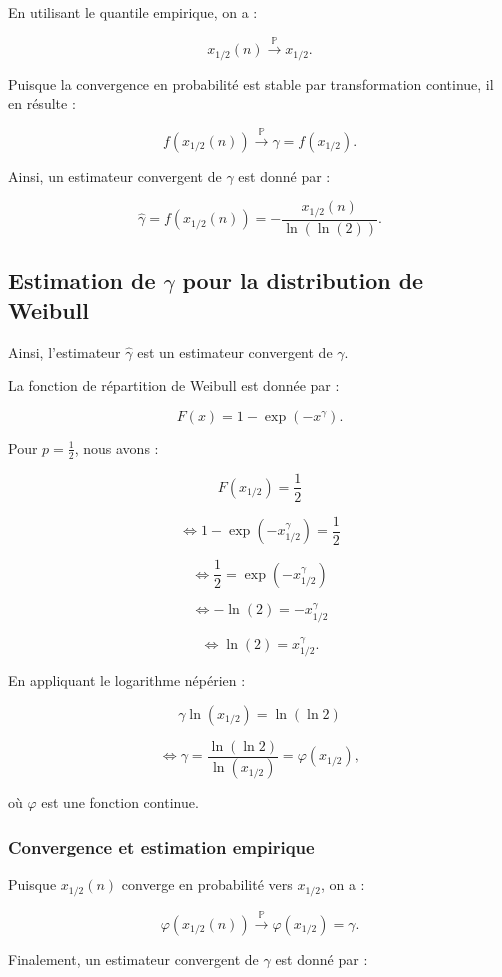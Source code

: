 \documentclass{article}
\begin{document}
En utilisant le quantile empirique, on a :

\[
x_{1/2}(n) \xrightarrow{\mathbb{P}} x_{1/2}.
\]

Puisque la convergence en probabilité est stable par transformation continue, il en résulte :

\[
f(x_{1/2}(n)) \xrightarrow{\mathbb{P}} \gamma = f(x_{1/2}).
\]

Ainsi, un estimateur convergent de \(\gamma\) est donné par :

\[
\hat{\gamma} = f(x_{1/2}(n)) = -\frac{x_{1/2}(n)}{\ln(\ln(2))}.
\]

\subsection{Estimation de \(\gamma\) pour la distribution de Weibull}

Ainsi, l'estimateur \(\hat{\gamma}\) est un estimateur convergent de \(\gamma\).

La fonction de répartition de Weibull est donnée par :

\[
F(x) = 1 - \exp(-x^{\gamma}).
\]

Pour \(p = \frac{1}{2}\), nous avons :

\[
F(x_{1/2}) = \frac{1}{2}
\]

\[
\iff 1 - \exp(-x_{1/2}^{\gamma}) = \frac{1}{2}
\]

\[
\iff \frac{1}{2} = \exp(-x_{1/2}^{\gamma})
\]

\[
\iff -\ln(2) = -x_{1/2}^{\gamma}
\]

\[
\iff \ln(2) = x_{1/2}^{\gamma}.
\]

En appliquant le logarithme népérien :

\[
\gamma \ln(x_{1/2}) = \ln(\ln 2)
\]

\[
\iff \gamma = \frac{\ln(\ln 2)}{\ln(x_{1/2})} = \varphi(x_{1/2}),
\]

où \(\varphi\) est une fonction continue.

\subsubsection{Convergence et estimation empirique}

Puisque \(x_{1/2}(n)\) converge en probabilité vers \(x_{1/2}\), on a :

\[
\varphi(x_{1/2}(n)) \xrightarrow{\mathbb{P}} \varphi(x_{1/2}) = \gamma.
\]

Finalement, un estimateur convergent de \(\gamma\) est donné par :
\end{document}
